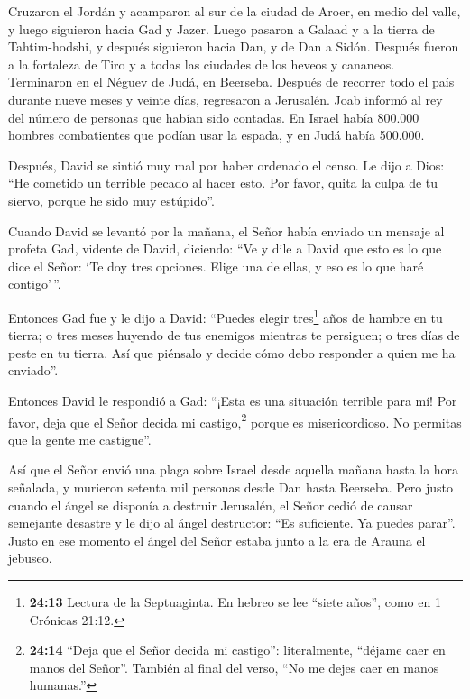  Cruzaron el Jordán y acamparon al sur de la ciudad de
Aroer, en medio del valle, y luego siguieron hacia Gad y Jazer.
 Luego pasaron a Galaad y a la tierra de Tahtim-hodshi, y
después siguieron hacia Dan, y de Dan a Sidón.  Después
fueron a la fortaleza de Tiro y a todas las ciudades de los heveos y
cananeos. Terminaron en el Néguev de Judá, en Beerseba. 
Después de recorrer todo el país durante nueve meses y veinte días,
regresaron a Jerusalén.  Joab informó al rey del número de
personas que habían sido contadas. En Israel había 800.000 hombres
combatientes que podían usar la espada, y en Judá había 500.000.

 Después, David se sintió muy mal por haber ordenado el
censo. Le dijo a Dios: ``He cometido un terrible pecado al hacer esto.
Por favor, quita la culpa de tu siervo, porque he sido muy estúpido''.

 Cuando David se levantó por la mañana, el Señor había
enviado un mensaje al profeta Gad, vidente de David, diciendo:
 ``Ve y dile a David que esto es lo que dice el Señor: `Te
doy tres opciones. Elige una de ellas, y eso es lo que haré
contigo'\,''.

 Entonces Gad fue y le dijo a David: ``Puedes elegir
tres\footnote{\textbf{24:13} Lectura de la Septuaginta. En hebreo se lee
  ``siete años'', como en 1 Crónicas 21:12.} años de hambre en tu
tierra; o tres meses huyendo de tus enemigos mientras te persiguen; o
tres días de peste en tu tierra. Así que piénsalo y decide cómo debo
responder a quien me ha enviado''.

 Entonces David le respondió a Gad: ``¡Esta es una
situación terrible para mí! Por favor, deja que el Señor decida mi
castigo,\footnote{\textbf{24:14} ``Deja que el Señor decida mi
  castigo'': literalmente, ``déjame caer en manos del Señor''. También
  al final del verso, ``No me dejes caer en manos humanas.''} porque es
misericordioso. No permitas que la gente me castigue''.

 Así que el Señor envió una plaga sobre Israel desde
aquella mañana hasta la hora señalada, y murieron setenta mil personas
desde Dan hasta Beerseba.  Pero justo cuando el ángel se
disponía a destruir Jerusalén, el Señor cedió de causar semejante
desastre y le dijo al ángel destructor: ``Es suficiente. Ya puedes
parar''. Justo en ese momento el ángel del Señor estaba junto a la era
de Arauna el jebuseo.

